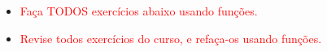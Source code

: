 \documentclass[12pt,a4paper]{article}
\begin{document}
\begin{center}
\end{center}



\begin{huge}
\begin{itemize}
  \item  \textcolor{red}{Faça TODOS exercícios abaixo usando funções.}

\item  \textcolor{red}{Revise todos exercícios do curso, e refaça-os  usando funções.}

\end{itemize}
\end{huge}
\end{document}
